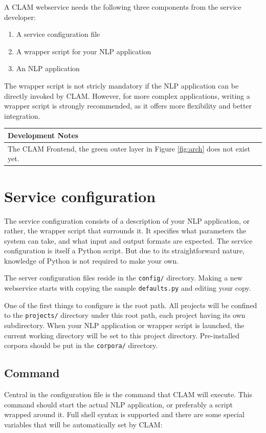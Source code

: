 \documentclass[a4paper,12pt]{report}
\newenvironment{devnotes}
{\newpage
\begin{center}
    \begin{tabular}[h!]{|p{0.8\textwidth}|}
    \hline
    {\bf Development Notes}\\\hline}
{   \\\hline
    \end{tabular}
\end{center}}
\begin{document}
A CLAM webservice needs the following three components from the service developer:

\begin{enumerate}
\item A service configuration file
\item A wrapper script for your NLP application
\item An NLP application
\end{enumerate}

The wrapper script is not stricly mandatory if the NLP application can be directly invoked by CLAM. However, for more complex applications, writing a wrapper script is strongly recommended, as it offers more flexibility and better integration.

\begin{devnotes}
The CLAM Frontend, the green outer layer in Figure \ref{fig:arch} does not exist yet.
\end{devnotes}


\section{Service configuration}

The service configuration consists of a description of your NLP application, or rather, the wrapper script that surrounds it. It specifies what parameters the system can take, and what input and output formats are expected. The service configuration is itself a Python script. But due to its straightforward nature, knowledge of Python is not required to make your own.

The server configuration files reside in the \texttt{config/} directory. Making a new webservice starts with copying the sample \texttt{defaults.py} and editing your copy.

One of the first things to configure is the root path. All projects will be confined to the \texttt{projects/} directory under this root path, each project having its own subdirectory. When your NLP application or wrapper script is launched, the current working directory will be set to this project directory. Pre-installed corpora should be put in the \texttt{corpora/} directory. 
 
\subsection{Command}
\label{sec:command}

Central in the configuration file is the command that CLAM will execute. This command should start the actual NLP application, or preferably a script wrapped around it. Full shell syntax is supported and there are some special variables that will be automatically set by CLAM:
\end{document}
